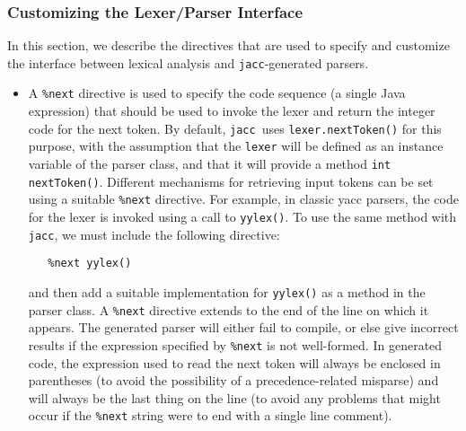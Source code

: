 \documentclass[12pt]{article}
\def\jacc{{\tt jacc}}
\begin{document}
\subsubsection{Customizing the Lexer/Parser Interface}
\label{sec-directives-interface}
In this section, we describe the directives that are used to
specify and customize the interface between lexical analysis
and \jacc-generated parsers.
\begin{itemize}
\item A \verb"%next" directive is used to specify the code
      sequence (a single Java expression) that should be used to
      invoke the lexer and return the integer code for the next
      token.  By default, \jacc\ uses \verb"lexer.nextToken()" for
      this purpose, with the assumption that the \verb"lexer" will
      be defined as an instance variable of the parser class, and
      that it will provide a method \verb"int nextToken()".  Different
      mechanisms for retrieving input tokens can be set using a
      suitable \verb"%next" directive.  For example, in classic
      yacc parsers, the code for the lexer is invoked using a
      call to \verb"yylex()".  To use the same method with
      \jacc, we must include the following directive:
\begin{verbatim}
   %next yylex()
\end{verbatim}
      and then add a suitable implementation for \verb"yylex()" as a
      method in the parser class.  A \verb"%next" directive extends
      to the end of the line on which it appears.   The generated
      parser will either fail to compile, or else give incorrect
      results if the expression specified by \verb"%next" is not
      well-formed.  In generated code, the expression used to
      read the next token will always be enclosed in parentheses
      (to avoid the possibility of a precedence-related misparse)
      and will always be the last thing on the line (to avoid
      any problems that might occur if the \verb"%next" string
      were to end with a single line comment).


\end{itemize}
\end{document}
